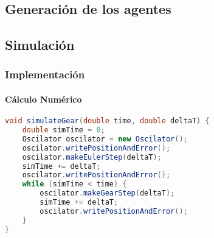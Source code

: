 \documentclass[hyperref={pdfpagelayout=SinglePage}]{beamer}
\begin{document}
\subsection{Generación de los agentes}


\subsection{Simulación}


\begin{frame}[fragile]
\frametitle{Implementación}
\framesubtitle{Cálculo Numérico}
\begin{lstlisting}[language=Java, caption = Método de Gear Predictor Corrector.]
void simulateGear(double time, double deltaT) {
	double simTime = 0;
    Oscilator oscilator = new Oscilator();
	oscilator.writePositionAndError();
    oscilator.makeEulerStep(deltaT);
    simTime += deltaT;
	oscilator.writePositionAndError();
    while (simTime < time) {
    	oscilator.makeGearStep(deltaT);
        simTime += deltaT;
		oscilator.writePositionAndError();
    }
}
\end{lstlisting}
\end{frame}
\end{document}
